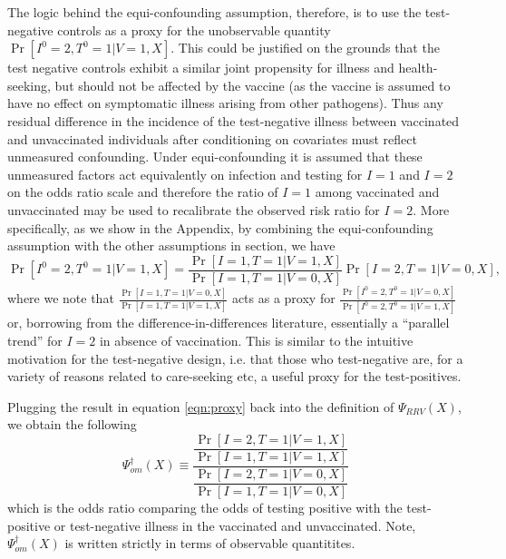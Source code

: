 \documentclass[11pt]{article}
\begin{document}
The logic behind the equi-confounding assumption, therefore, is to use the test-negative controls as a proxy for the unobservable quantity $\Pr[I^0 = 2, T^0 = 1 | V = 1, X]$. This could be justified on the grounds that the test negative controls exhibit a similar joint propensity for illness and health-seeking, but should not be affected by the vaccine (as the vaccine is assumed to have no effect on symptomatic illness arising from other pathogens). Thus any residual difference in the incidence of the test-negative illness between vaccinated and unvaccinated individuals after conditioning on covariates must reflect unmeasured confounding. Under equi-confounding it is assumed that these unmeasured factors act equivalently on infection and testing for $I=1$ and $I=2$ on the odds ratio scale and therefore the ratio of $I=1$ among vaccinated and unvaccinated may be used to recalibrate the observed risk ratio for $I = 2$. More specifically, as we show in the Appendix, by combining the equi-confounding assumption with the other assumptions in section, we have
    \begin{equation}\label{eqn:proxy}
     \Pr[I^0 = 2, T^0 = 1  | V = 1, X] = \frac{\Pr[I = 1, T = 1  | V = 1, X]}{\Pr[I = 1, T = 1  | V = 0, X]}\Pr[I = 2, T = 1 | V = 0, X],
    \end{equation}
where we note that $\frac{\Pr[I = 1, T =1  | V = 0, X]}{\Pr[I = 1, T = 1 | V = 1, X]}$ acts as a proxy for $\frac{\Pr[I^0 = 2, T^0 =1  | V = 0, X]}{\Pr[I^0 = 2, T^0 = 1 | V = 1, X]}$ or, borrowing from the difference-in-differences literature, essentially a ``parallel trend'' for $I=2$ in absence of vaccination. This is similar to the intuitive motivation for the test-negative design, i.e. that those who test-negative are, for a variety of reasons related to care-seeking etc, a useful proxy for the test-positives. 

Plugging the result in equation \ref{eqn:proxy} back into the definition of $\Psi_{RRV}(X)$, we obtain the following 
    \begin{equation}\label{eqn:cohort_estimand}
         \Psi^\dagger_{om}(X) \equiv \dfrac{\dfrac{\Pr[I = 2, T = 1 | V = 1, X]}{\Pr[I = 1, T = 1 | V = 1, X]}}{\dfrac{\Pr[I = 2, T = 1 | V = 0, X]}{\Pr[I = 1, T = 1 | V = 0, X]}}
    \end{equation}
which is the odds ratio comparing the odds of testing positive with the test-positive or test-negative illness in the vaccinated and unvaccinated. Note, $\Psi^\dagger_{om}(X)$ is written strictly in terms of observable quantitites.
\end{document}

